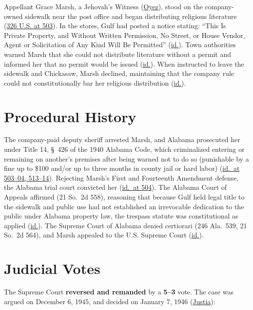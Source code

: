 \documentclass[12pt]{article}
\begin{document}
Appellant Grace Marsh, a Jehovah's Witness (\href{https://www.oyez.org/cases/1940-1955/326us501}{Oyez}), stood on the company-owned sidewalk near the post office and began distributing religious literature (\href{https://supreme.justia.com/cases/federal/us/326/501/}{326 U.S. at 503}). In the stores, Gulf had posted a notice stating: ``This Is Private Property, and Without Written Permission, No Street, or House Vendor, Agent or Solicitation of Any Kind Will Be Permitted'' (\href{https://supreme.justia.com/cases/federal/us/326/501/}{id.}). Town authorities warned Marsh that she could not distribute literature without a permit and informed her that no permit would be issued (\href{https://supreme.justia.com/cases/federal/us/326/501/}{id.}). When instructed to leave the sidewalk and Chickasaw, Marsh declined, maintaining that the company rule could not constitutionally bar her religious distribution (\href{https://supreme.justia.com/cases/federal/us/326/501/}{id.}).

\section{Procedural History}
The company-paid deputy sheriff arrested Marsh, and Alabama prosecuted her under Title 14, \S~426 of the 1940 Alabama Code, which criminalized entering or remaining on another's premises after being warned not to do so (punishable by a fine up to \$100 and/or up to three months in county jail or hard labor) (\href{https://supreme.justia.com/cases/federal/us/326/501/}{id.\ at 503--04, 513--14}). Rejecting Marsh's First and Fourteenth Amendment defense, the Alabama trial court convicted her (\href{https://supreme.justia.com/cases/federal/us/326/501/}{id.\ at 504}). The Alabama Court of Appeals affirmed (21 So.~2d 558), reasoning that because Gulf held legal title to the sidewalk and public use had not established an irrevocable dedication to the public under Alabama property law, the trespass statute was constitutional as applied (\href{https://supreme.justia.com/cases/federal/us/326/501/}{id.}). The Supreme Court of Alabama denied certiorari (246 Ala.~539, 21 So.~2d 564), and Marsh appealed to the U.S. Supreme Court (\href{https://supreme.justia.com/cases/federal/us/326/501/}{id.}).

\section{Judicial Votes}
The Supreme Court \textbf{reversed and remanded} by a \textbf{5--3} vote. The case was argued on December 6, 1945, and decided on January 7, 1946 (\href{https://supreme.justia.com/cases/federal/us/326/501/}{Justia}):
\end{document}
